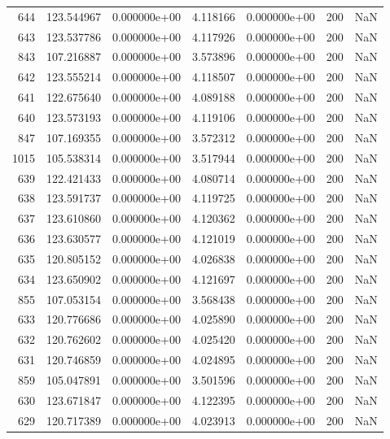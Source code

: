\begin{tabular}{rrrrrrr}
 644 & 123.544967 &  0.000000e+00 &  4.118166 &  0.000000e+00 &         200 & NaN \\
 643 & 123.537786 &  0.000000e+00 &  4.117926 &  0.000000e+00 &         200 & NaN \\
 843 & 107.216887 &  0.000000e+00 &  3.573896 &  0.000000e+00 &         200 & NaN \\
 642 & 123.555214 &  0.000000e+00 &  4.118507 &  0.000000e+00 &         200 & NaN \\
 641 & 122.675640 &  0.000000e+00 &  4.089188 &  0.000000e+00 &         200 & NaN \\
 640 & 123.573193 &  0.000000e+00 &  4.119106 &  0.000000e+00 &         200 & NaN \\
 847 & 107.169355 &  0.000000e+00 &  3.572312 &  0.000000e+00 &         200 & NaN \\
1015 & 105.538314 &  0.000000e+00 &  3.517944 &  0.000000e+00 &         200 & NaN \\
 639 & 122.421433 &  0.000000e+00 &  4.080714 &  0.000000e+00 &         200 & NaN \\
 638 & 123.591737 &  0.000000e+00 &  4.119725 &  0.000000e+00 &         200 & NaN \\
 637 & 123.610860 &  0.000000e+00 &  4.120362 &  0.000000e+00 &         200 & NaN \\
 636 & 123.630577 &  0.000000e+00 &  4.121019 &  0.000000e+00 &         200 & NaN \\
 635 & 120.805152 &  0.000000e+00 &  4.026838 &  0.000000e+00 &         200 & NaN \\
 634 & 123.650902 &  0.000000e+00 &  4.121697 &  0.000000e+00 &         200 & NaN \\
 855 & 107.053154 &  0.000000e+00 &  3.568438 &  0.000000e+00 &         200 & NaN \\
 633 & 120.776686 &  0.000000e+00 &  4.025890 &  0.000000e+00 &         200 & NaN \\
 632 & 120.762602 &  0.000000e+00 &  4.025420 &  0.000000e+00 &         200 & NaN \\
 631 & 120.746859 &  0.000000e+00 &  4.024895 &  0.000000e+00 &         200 & NaN \\
 859 & 105.047891 &  0.000000e+00 &  3.501596 &  0.000000e+00 &         200 & NaN \\
 630 & 123.671847 &  0.000000e+00 &  4.122395 &  0.000000e+00 &         200 & NaN \\
 629 & 120.717389 &  0.000000e+00 &  4.023913 &  0.000000e+00 &         200 & NaN \\

\end{tabular}
